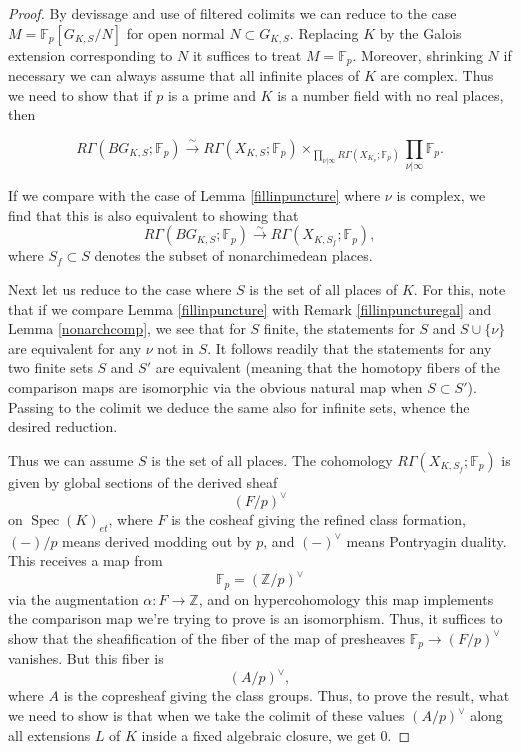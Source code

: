 \documentclass[12pt]{article}
\theoremstyle{definition}
\newcommand{\on}{\operatorname}
\newcommand{\mbb}{\mathbb}
\begin{document}
\begin{proof}
By devissage and use of filtered colimits we can reduce to the case $M=\mbb{F}_p[G_{K,S}/N]$ for open normal $N\subset G_{K,S}$.  Replacing $K$ by the Galois extension corresponding to $N$ it suffices to treat $M=\mbb{F}_p$.  Moreover, shrinking $N$ if necessary we can always assume that all infinite places of $K$ are complex.  Thus we need to show that if $p$ is a prime and $K$ is a number field with no real places, then

$$R\Gamma(BG_{K,S};\mbb{F}_p)\overset{\sim}{\rightarrow}R\Gamma(X_{K,S};\mbb{F}_p)\times_{\prod_{\nu|\infty}R\Gamma(X_{K_\nu};\mbb{F}_p)}\prod_{\nu|\infty}\mbb{F}_p.$$

\noindent If we compare with the case of Lemma \ref{fillinpuncture} where $\nu$ is complex, we find that this is also equivalent to showing that 
$$R\Gamma(BG_{K,S};\mbb{F}_p)\overset{\sim}{\rightarrow} R\Gamma(X_{K,S_f};\mbb{F}_p),$$
where $S_f\subset S$ denotes the subset of nonarchimedean places.


Next let us reduce to the case where $S$ is the set of all places of $K$.  For this, note that if we compare Lemma \ref{fillinpuncture} with Remark \ref{fillinpuncturegal} and Lemma \ref{nonarchcomp}, we see that for $S$ finite, the statements for $S$ and $S\cup\{\nu\}$ are equivalent for any $\nu$ not in $S$.  It follows readily that the statements for any two finite sets $S$ and $S'$ are equivalent (meaning that the homotopy fibers of the comparison maps are isomorphic via the obvious natural map when $S\subset S'$).  Passing to the colimit we deduce the same also for infinite sets, whence the desired reduction.

Thus we can assume $S$ is the set of all places.  The cohomology $R\Gamma(X_{K,S_f};\mbb{F}_p)$ is given by global sections of the derived sheaf
$$(F/p)^\vee$$
on $\on{Spec}(K)_{et}$, where $F$ is the cosheaf giving the refined class formation, $(-)/p$ means derived modding out by $p$, and $(-)^\vee$ means Pontryagin duality.  This receives a map from
$$\mbb{F}_p = (\mbb{Z}/p)^\vee$$
via the augmentation $\alpha:F\to\mbb{Z}$, and on hypercohomology this map implements the comparison map we're trying to prove is an isomorphism.  Thus, it suffices to show that the sheafification of the fiber of the map of presheaves $\mbb{F}_p\to (F/p)^\vee$ vanishes.  But this fiber is
$$(A/p)^\vee,$$
where $A$ is the copresheaf giving the class groups.  Thus, to prove the result, what we need to show is that when we take the colimit of these values $(A/p)^\vee$ along all extensions $L$ of $K$ inside a fixed algebraic closure, we get $0$.


\end{proof}
\end{document}

